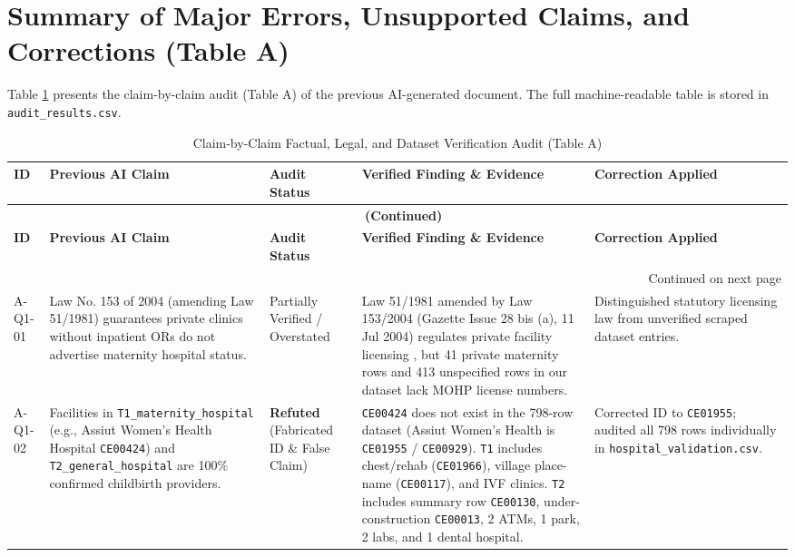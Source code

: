 \documentclass[10pt,a4paper]{article}
\begin{document}
\section{Summary of Major Errors, Unsupported Claims, and Corrections (Table A)}

Table \ref{tab:table_a} presents the claim-by-claim audit (Table A) of the previous AI-generated document. The full machine-readable table is stored in \texttt{audit\_results.csv}.

{\footnotesize
\begin{longtable}{p{1.1cm} p{3.8cm} p{2.3cm} p{5.2cm} p{3.4cm}}
\caption{Claim-by-Claim Factual, Legal, and Dataset Verification Audit (Table A)} \label{tab:table_a} \\
\toprule
\textbf{ID} & \textbf{Previous AI Claim} & \textbf{Audit Status} & \textbf{Verified Finding \& Evidence} & \textbf{Correction Applied} \\
\midrule
\endfirsthead
\multicolumn{5}{c}{{\bfseries \tablename\ \thetable{} (Continued)}} \\
\toprule
\textbf{ID} & \textbf{Previous AI Claim} & \textbf{Audit Status} & \textbf{Verified Finding \& Evidence} & \textbf{Correction Applied} \\
\midrule
\endhead
\midrule \multicolumn{5}{r}{{Continued on next page}} \\ \bottomrule
\endfoot
\bottomrule
\endlastfoot
A-Q1-01 & Law No. 153 of 2004 (amending Law 51/1981) guarantees private clinics without inpatient ORs do not advertise maternity hospital status. & Partially Verified / Overstated & Law 51/1981 amended by Law 153/2004 (Gazette Issue 28 bis (a), 11 Jul 2004) regulates private facility licensing \cite{egypt_law_51_1981_153_2004}, but 41 private maternity rows and 413 unspecified rows in our dataset lack MOHP license numbers. & Distinguished statutory licensing law from unverified scraped dataset entries. \\[0.4em]
A-Q1-02 & Facilities in \texttt{T1\_maternity\_hospital} (e.g., Assiut Women's Health Hospital \texttt{CE00424}) and \texttt{T2\_general\_hospital} are 100\% confirmed childbirth providers. & \textcolor{accentred}{\textbf{Refuted}} (Fabricated ID \& False Claim) & \texttt{CE00424} does not exist in the 798-row dataset (Assiut Women's Health is \texttt{CE01955} / \texttt{CE00929}). \texttt{T1} includes chest/rehab (\texttt{CE01966}), village place-name (\texttt{CE00117}), and IVF clinics. \texttt{T2} includes summary row \texttt{CE00130}, under-construction \texttt{CE00013}, 2 ATMs, 1 park, 2 labs, and 1 dental hospital. & Corrected ID to \texttt{CE01955}; audited all 798 rows individually in \texttt{hospital\_validation.csv}. \\[0.4em]

\end{longtable}}
\end{document}
